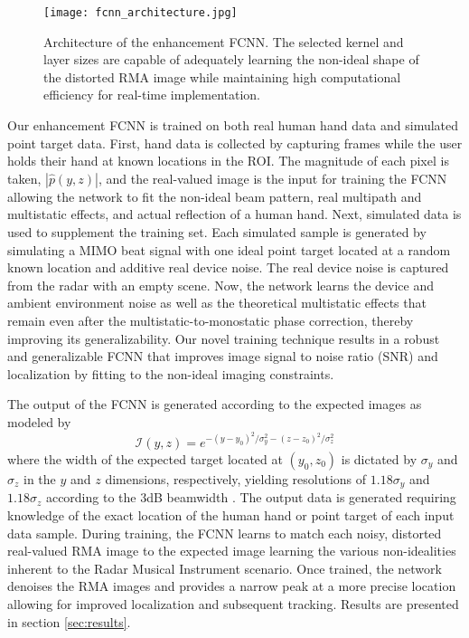 \documentclass[10pt,journal,final]{IEEEtran}
\begin{document}
\begin{figure}[h]
	\centering
	\texttt{[image: fcnn\_architecture.jpg]}
	\caption{Architecture of the enhancement FCNN. The selected kernel and layer sizes are capable of adequately learning the non-ideal shape of the distorted RMA image while maintaining high computational efficiency for real-time implementation.}
	\label{fig:fcnn_architecture}
\end{figure}

Our enhancement FCNN is trained on both real human hand data and simulated point target data. First, hand data is collected by capturing frames while the user holds their hand at known locations in the ROI. The magnitude of each pixel is taken, $|\hat{p}(y,z)|$, and the real-valued image is the input for training the FCNN allowing the network to fit the non-ideal beam pattern, real multipath and multistatic effects, and actual reflection of a human hand. Next, simulated data is used to supplement the training set. Each simulated sample is generated by simulating a MIMO beat signal with one ideal point target located at a random known location and additive real device noise. The real device noise is captured from the radar with an empty scene. Now, the network learns the device and ambient environment noise as well as the theoretical multistatic effects that remain even after the multistatic-to-monostatic phase correction, thereby improving its generalizability. Our novel training technique results in a robust and generalizable FCNN that improves image signal to noise ratio (SNR) and localization by fitting to the non-ideal imaging constraints. 

The output of the FCNN is generated according to the expected images as modeled by 
\begin{equation}
	\label{eq:fcnn_expected_image}
	\mathcal{I}(y,z) = e^{-(y - y_0)^2/\sigma_y^2 -(z - z_0)^2/\sigma_z^2}
\end{equation}
where the width of the expected target located at $(y_0,z_0)$ is dictated by $\sigma_y$ and $\sigma_z$ in the $y$ and $z$ dimensions, respectively, yielding resolutions of $1.18\sigma_y$ and $1.18\sigma_z$ according to the $3$dB beamwidth \cite{sar_cnn:direct1}. The output data is generated requiring knowledge of the exact location of the human hand or point target of each input data sample. During training, the FCNN learns to match each noisy, distorted real-valued RMA image to the expected image learning the various non-idealities inherent to the Radar Musical Instrument scenario. Once trained, the network denoises the RMA images and provides a narrow peak at a more precise location allowing for improved localization and subsequent tracking. Results are presented in section \ref{sec:results}.
\end{document}
